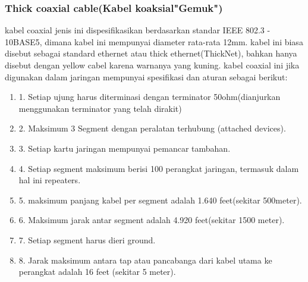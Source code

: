 \begin{itemize}
\begin{itemize}
\subsubsection{Thick coaxial cable(Kabel koaksial"Gemuk")}
kabel coaxial jenis ini dispesifikasikan berdasarkan standar IEEE 802.3 - 10BASE5, dimana kabel ini mempunyai diameter rata-rata 12mm. kabel ini biasa disebut sebagai standard ethernet atau thick ethernet(ThickNet), bahkan hanya disebut dengan yellow cabel karena warnanya yang kuning.
kabel coaxial ini jika digunakan dalam jaringan mempunyai spesifikasi dan aturan sebagai berikut:
\begin{enumerate}
	\item 1. Setiap ujung harus diterminasi dengan terminator 50ohm(dianjurkan menggunakan terminator yang telah dirakit)
	\item 2. Maksimum 3 Segment dengan peralatan terhubung (attached devices).
	\item 3. Setiap kartu jaringan mempunyai pemancar tambahan.
	\item 4. Setiap segment maksimum berisi 100 perangkat jaringan, termasuk dalam hal ini repeaters.
	\item 5. maksimum panjang kabel per segment adalah 1.640 feet(sekitar 500meter).
	\item 6. Maksimum jarak antar segment adalah 4.920 feet(sekitar 1500 meter).
	\item 7. Setiap segment harus dieri ground.
	\item 8. Jarak maksimum antara tap atau pancabanga dari kabel utama ke perangkat adalah 16 feet (sekitar 5 meter).
\end{enumerate}
	

\end{itemize}
\end{itemize}
